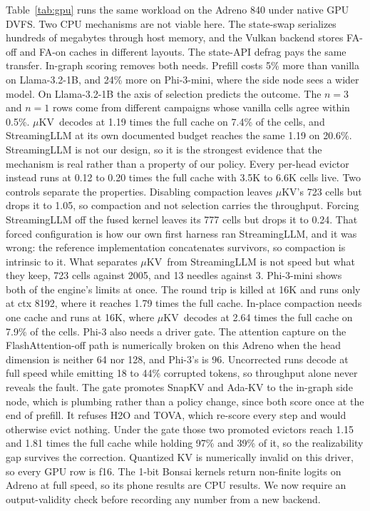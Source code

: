 \documentclass[sigconf, anonymous=false, screen=true]{acmart}
\newcommand{\muKV}{$\mu$KV}
\begin{document}
Table~\ref{tab:gpu} runs the same workload on the Adreno 840 under native GPU DVFS. Two CPU mechanisms are not viable here. The state-swap serializes hundreds of megabytes through host memory, and the Vulkan backend stores FA-off and FA-on caches in different layouts. The state-API defrag pays the same transfer. In-graph scoring removes both needs. Prefill costs 5\% more than vanilla on Llama-3.2-1B, and 24\% more on Phi-3-mini, where the side node sees a wider model. On Llama-3.2-1B the axis of selection predicts the outcome. The $n{=}3$ and $n{=}1$ rows come from different campaigns whose vanilla cells agree within 0.5\%. \muKV\ decodes at 1.19 times the full cache on 7.4\% of the cells, and StreamingLLM at its own documented budget reaches the same 1.19 on 20.6\%. StreamingLLM is not our design, so it is the strongest evidence that the mechanism is real rather than a property of our policy. Every per-head evictor instead runs at 0.12 to 0.20 times the full cache with 3.5K to 6.6K cells live. Two controls separate the properties. Disabling compaction leaves \muKV's 723 cells but drops it to 1.05, so compaction and not selection carries the throughput. Forcing StreamingLLM off the fused kernel leaves its 777 cells but drops it to 0.24. That forced configuration is how our own first harness ran StreamingLLM, and it was wrong: the reference implementation concatenates survivors, so compaction is intrinsic to it. What separates \muKV\ from StreamingLLM is not speed but what they keep, 723 cells against 2005, and 13 needles against 3. Phi-3-mini shows both of the engine's limits at once. The round trip is killed at 16K and runs only at ctx 8192, where it reaches 1.79 times the full cache. In-place compaction needs one cache and runs at 16K, where \muKV\ decodes at 2.64 times the full cache on 7.9\% of the cells. Phi-3 also needs a driver gate. The attention capture on the FlashAttention-off path is numerically broken on this Adreno when the head dimension is neither 64 nor 128, and Phi-3's is 96. Uncorrected runs decode at full speed while emitting 18 to 44\% corrupted tokens, so throughput alone never reveals the fault. The gate promotes SnapKV and Ada-KV to the in-graph side node, which is plumbing rather than a policy change, since both score once at the end of prefill. It refuses H2O and TOVA, which re-score every step and would otherwise evict nothing. Under the gate those two promoted evictors reach 1.15 and 1.81 times the full cache while holding 97\% and 39\% of it, so the realizability gap survives the correction. Quantized KV is numerically invalid on this driver, so every GPU row is f16. The 1-bit Bonsai kernels return non-finite logits on Adreno at full speed, so its phone results are CPU results. We now require an output-validity check before recording any number from a new backend.
\end{document}
